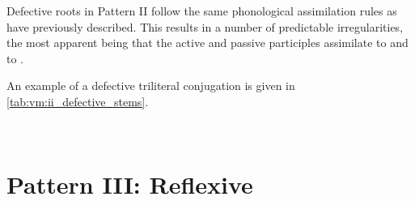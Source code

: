 \documentclass[grammar]{subfiles}
\begin{document}
Defective roots in Pattern II follow the same phonological assimilation rules
as have previously described.  This results in a number of predictable
irregularities, the most apparent being that the active and passive participles
assimilate  to  and  to .

An example of a defective triliteral conjugation is given in \cref{tab:vm:ii_defective_stems}. 

\begin{table}[h!]\small\capstart
  \centering
  \\
  \caption{Pattern II defective stems \label{tab:vm:ii_defective_stems}}
\end{table}


\clearpage
\section{Pattern III: Reflexive}
\label{sec:vm:pattern_iii}
\end{document}
